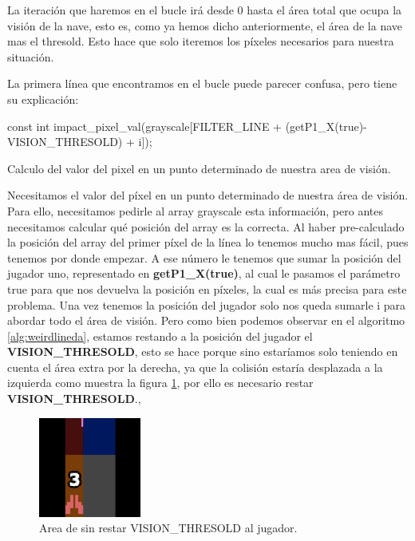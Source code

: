 La iteración que haremos en el bucle irá desde 0 hasta el área total que ocupa la visión de la nave, esto es, como ya hemos dicho anteriormente, el área de la nave mas el thresold. Esto hace que solo iteremos los píxeles necesarios para nuestra situación.

La primera línea que encontramos en el bucle puede parecer confusa, pero tiene su explicación:

\vspace{2mm}
\begin{algorithm}[H]
    const int impact\_pixel\_val(grayscale[FILTER\_LINE + (getP1\_X(true)-VISION\_THRESOLD) + i]);
	\caption{Calculo del valor del pixel en un punto determinado de nuestra area de visión.}
	\label{alg:weirdlineda}
\end{algorithm}
\vspace{2mm}

Necesitamos el valor del píxel en un punto determinado de nuestra área de visión. Para ello, necesitamos pedirle al array grayscale esta información, pero antes necesitamos calcular qué posición del array es la correcta. Al haber pre-calculado la posición del array del primer píxel de la línea lo tenemos mucho mas fácil, pues tenemos por donde empezar. A ese número le tenemos que sumar la posición del jugador uno, representado en \textbf{getP1\_X(true)}, al cual le pasamos el parámetro true para que nos devuelva la posición en píxeles, la cual es más precisa para este problema. Una vez tenemos la posición del jugador solo nos queda sumarle i para abordar todo el área de visión. Pero como bien podemos observar en el algoritmo \ref{alg:weirdlineda}, estamos restando a la posición del jugador el \textbf{VISION\_THRESOLD}, esto se hace porque sino estaríamos solo teniendo en cuenta el área extra por la derecha, ya que la colisión estaría desplazada a la izquierda como muestra la figura 	\ref{fig:colisioncalculadaerroneamenteda}, por ello es necesario restar \textbf{VISION\_THRESOLD}.,

\begin{figure}[h]
	\centering
	\includegraphics[width=0.3\textwidth]{Figures/colisioncalculadaerroneamenteda}
	\caption{Area de sin restar VISION\_THRESOLD al jugador.}
	\label{fig:colisioncalculadaerroneamenteda}
\end{figure}

